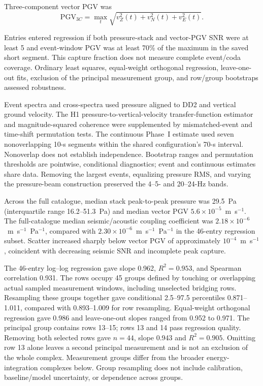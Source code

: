 \documentclass[]{seismica}
\begin{document}
Three-component vector PGV was
\begin{equation}
 \mathrm{PGV}_{3C}=\max_t\sqrt{v_Z^2(t)+v_N^2(t)+v_E^2(t)}.
\end{equation}

Entries entered regression if both pressure-stack and vector-PGV SNR were at
least 5 and event-window PGV was at least 70\% of the maximum in the saved
short segment. This capture fraction does not measure complete event/coda
coverage. Ordinary least squares, equal-weight orthogonal regression,
leave-one-out fits, exclusion of the principal measurement group, and
row/group bootstraps assessed robustness.

Event spectra and cross-spectra used pressure aligned to DD2 and vertical
ground velocity. The H1 pressure-to-vertical-velocity transfer-function
estimator and magnitude-squared coherence were supplemented by
mismatched-event and time-shift permutation tests. The continuous Phase~I
estimate used seven nonoverlapping 10-s segments within the shared
configuration's 70-s interval. Nonoverlap does not establish independence.
Bootstrap ranges and permutation thresholds are pointwise, conditional
diagnostics; event and continuous estimates share data. Removing the largest
events, equalizing pressure RMS, and varying the pressure-beam construction
preserved the 4--5- and 20--24-Hz bands.

Across the full catalogue, median stack peak-to-peak pressure was 29.5~Pa
(interquartile range 16.2--51.3~Pa) and median vector PGV
$5.6\times10^{-5}$~m~s$^{-1}$. The full-catalogue median seismic/acoustic
coupling coefficient was $2.18\times10^{-6}$~m~s$^{-1}$~Pa$^{-1}$,
compared with $2.30\times10^{-6}$~m~s$^{-1}$~Pa$^{-1}$ in the
46-entry regression subset. Scatter increased sharply below vector PGV of
approximately $10^{-4}$~m~s$^{-1}$, coincident with decreasing seismic SNR
and incomplete peak capture.

The 46-entry log--log regression gave slope 0.962, $R^2=0.953$, and Spearman
correlation 0.931. The rows occupy 45 groups defined by touching or overlapping
actual sampled measurement windows, including unselected bridging rows.
Resampling these groups together gave conditional 2.5--97.5 percentiles
0.871--1.011, compared with 0.893--1.009 for row resampling. Equal-weight
orthogonal regression gave 0.986 and leave-one-out slopes ranged from 0.952
to 0.971. The principal group contains rows 13--15; rows 13 and 14 pass
regression quality. Removing both selected rows gave $n=44$, slope 0.943 and
$R^2=0.905$. Omitting row 13 alone leaves a second principal measurement and
is not an exclusion of the whole complex. Measurement groups differ from the
broader energy-integration complexes below. Group resampling does not include
calibration, baseline/model uncertainty, or dependence across groups.
\end{document}
